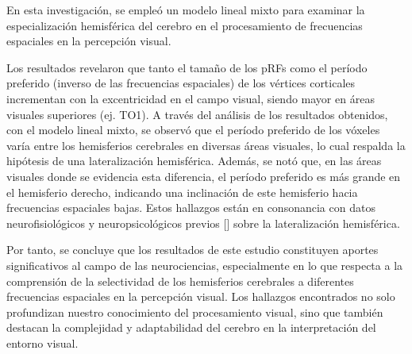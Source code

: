 \begin{conclusions}	
	
	En esta investigación, se empleó un modelo lineal mixto para examinar la especialización hemisférica del cerebro en el procesamiento de frecuencias espaciales en la percepción visual.
	
	Los resultados revelaron que tanto el tamaño de los pRFs como el período preferido (inverso de las frecuencias espaciales) de los vértices corticales incrementan con la excentricidad en el campo visual, siendo mayor en \'areas visuales superiores (ej. TO1). A través del análisis de los resultados obtenidos, con el modelo lineal mixto, se observ\'o que el período preferido  de los vóxeles varía entre los hemisferios cerebrales en diversas áreas visuales, lo cual respalda la hipótesis de una lateralización hemisférica. Además, se not\'o que, en las áreas visuales donde se evidencia esta diferencia, el período preferido es más grande en el hemisferio derecho, indicando una inclinación de este hemisferio hacia frecuencias espaciales bajas. Estos hallazgos están en consonancia con datos neurofisiológicos y neuropsicológicos previos [\cite{flevaris_spatial_2016}] sobre la lateralización hemisférica.
	
	Por tanto, se concluye que los resultados de este estudio constituyen aportes significativos al campo de las neurociencias, especialmente en lo que respecta a la comprensión de la selectividad de los hemisferios cerebrales a diferentes frecuencias espaciales en la percepción visual. Los  hallazgos encontrados no solo profundizan nuestro conocimiento del procesamiento visual, sino que también destacan la complejidad y adaptabilidad del cerebro en la interpretación del entorno visual.
	
         
         
\end{conclusions}
